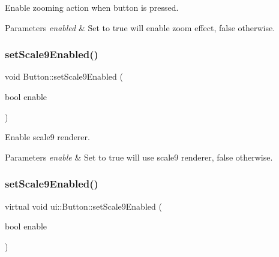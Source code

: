 Enable zooming action when button is pressed.


\begin{DoxyParams}{Parameters}
{\em enabled} & Set to true will enable zoom effect, false otherwise. \\
\hline
\end{DoxyParams}
\mbox{\label{classui_1_1Button_a7fb5abc162b5ccdd1e8efe732bdd3ec1}} 
\subsubsection{\texorpdfstring{set\+Scale9\+Enabled()}{setScale9Enabled()}\hspace{0.1cm}{\footnotesize\ttfamily [1/2]}}
{\footnotesize\ttfamily void Button\+::set\+Scale9\+Enabled (\begin{DoxyParamCaption}\item[{bool}]{enable }\end{DoxyParamCaption})\hspace{0.3cm}{\ttfamily [virtual]}}

Enable scale9 renderer.


\begin{DoxyParams}{Parameters}
{\em enable} & Set to true will use scale9 renderer, false otherwise. \\
\hline
\end{DoxyParams}
\mbox{\label{classui_1_1Button_a46f36be9062d9961c8137abf42860589}} 
\subsubsection{\texorpdfstring{set\+Scale9\+Enabled()}{setScale9Enabled()}\hspace{0.1cm}{\footnotesize\ttfamily [2/2]}}
{\footnotesize\ttfamily virtual void ui\+::\+Button\+::set\+Scale9\+Enabled (\begin{DoxyParamCaption}\item[{bool}]{enable }\end{DoxyParamCaption})\hspace{0.3cm}{\ttfamily [virtual]}}

